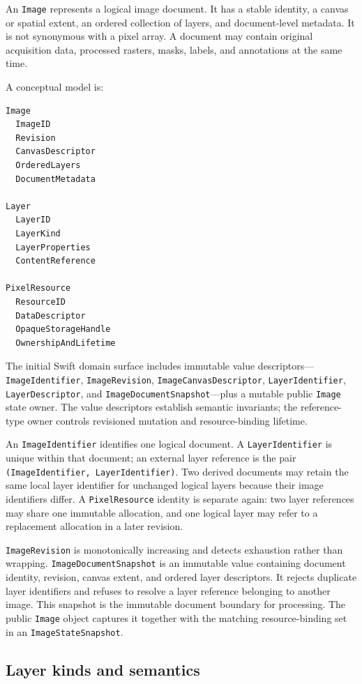 \documentclass[11pt,a4paper,oneside]{article}
\newcommand{\Image}{\texttt{Image}}
\begin{document}
An \Image{} represents a logical image document. It has a stable identity, a canvas or spatial extent, an ordered collection of layers, and document-level metadata. It is not synonymous with a pixel array. A document may contain original acquisition data, processed rasters, masks, labels, and annotations at the same time.

A conceptual model is:
\begin{lstlisting}
Image
  ImageID
  Revision
  CanvasDescriptor
  OrderedLayers
  DocumentMetadata

Layer
  LayerID
  LayerKind
  LayerProperties
  ContentReference

PixelResource
  ResourceID
  DataDescriptor
  OpaqueStorageHandle
  OwnershipAndLifetime
\end{lstlisting}

The initial Swift domain surface includes immutable value descriptors—\texttt{ImageIdentifier}, \texttt{ImageRevision}, \texttt{ImageCanvasDescriptor}, \texttt{LayerIdentifier}, \texttt{LayerDescriptor}, and \texttt{ImageDocumentSnapshot}—plus a mutable public \Image{} state owner. The value descriptors establish semantic invariants; the reference-type owner controls revisioned mutation and resource-binding lifetime.

An \texttt{ImageIdentifier} identifies one logical document. A \texttt{LayerIdentifier} is unique within that document; an external layer reference is the pair \texttt{(ImageIdentifier, LayerIdentifier)}. Two derived documents may retain the same local layer identifier for unchanged logical layers because their image identifiers differ. A \texttt{PixelResource} identity is separate again: two layer references may share one immutable allocation, and one logical layer may refer to a replacement allocation in a later revision.

\texttt{ImageRevision} is monotonically increasing and detects exhaustion rather than wrapping. \texttt{ImageDocumentSnapshot} is an immutable value containing document identity, revision, canvas extent, and ordered layer descriptors. It rejects duplicate layer identifiers and refuses to resolve a layer reference belonging to another image. This snapshot is the immutable document boundary for processing. The public \texttt{Image} object captures it together with the matching resource-binding set in an \texttt{ImageStateSnapshot}.

\subsection{Layer kinds and semantics}
\end{document}

